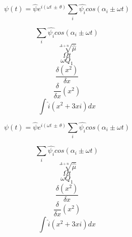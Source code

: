 \documentclass[16pt,a4paper]{article}
\begin{document}
\[\psi (t)=\hat{\psi}e^{i(\omega t\, \pm\, \theta)}\sum_i \hat{\psi_i} cos(\alpha_i \pm             \omega t)\]

\[\sum_i \hat{\psi_i} cos(\alpha_i \pm \omega t)\]
\[\sqrt[{\Delta+n}] {\hat {\mu}}\]
\[\Omega t\]
\[\omega Q_{1}\]
\[\frac{\delta (x^2)}{\delta x}\]
\[\frac{\delta}{\delta x} (x^2)\]
\[\int \hat{i}(x^2+3xi)dx\]

\begin{huge}
\[\psi (t)=\hat{\psi}e^{i(\omega t\, \pm\, \theta)}\sum_i \hat{\psi_i} cos(\alpha_i \pm     \omega t)\]

\[\sum_i \hat{\psi_i} cos(\alpha_i \pm \omega t)\]
\[\sqrt[{\Delta+n}] {\hat {\mu}}\]
\[\Omega t\]
\[\omega Q_{1}\]
\[\frac{\delta (x^2)}{\delta x}\]
\[\frac{\delta}{\delta x} (x^2)\]
\[\int \hat{i}(x^2+3xi)dx\]
\end{huge}
\end{document}
